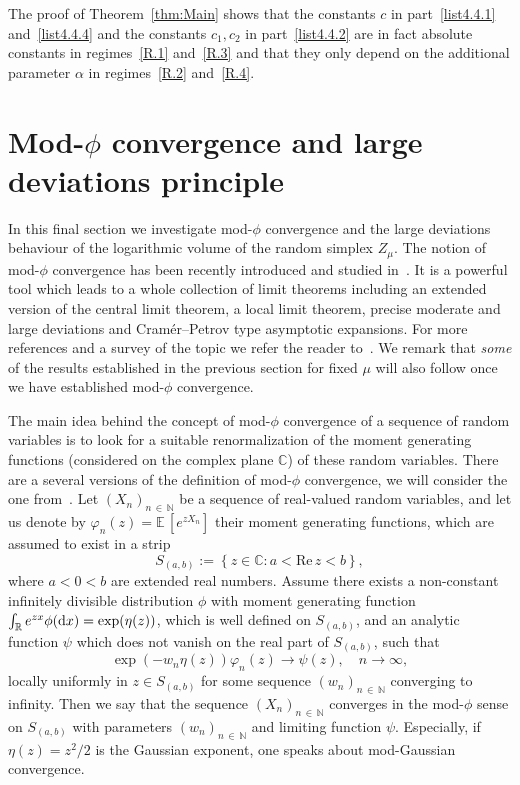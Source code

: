 \documentclass[AHL,Unicode,longabstracts,published]{cedram}
\newcommand{\R}{\mathbb{R}}
\newcommand{\EE}{\mathbb{E}\,}
\newcommand{\dd}{{\rm d}}
\renewcommand{\Re}{\text{Re}\,}
\begin{document}
\begin{rema}
The proof of Theorem~\ref{thm:Main} shows that the constants $c$ in part~\eqref{list4.4.1} and~\eqref{list4.4.4} and the constants $c_1,c_2$ in part~\eqref{list4.4.2} are in fact absolute constants in regimes~\eqref{R.1} and~\eqref{R.3} and that they only depend on the additional parameter $\alpha$ in regimes~\eqref{R.2} and~\eqref{R.4}.
\end{rema}

\section{Mod-\texorpdfstring{$\phi$}{phi} convergence and large deviations principle}\label{sec:ModPhi}

In this final section we investigate mod-$\phi$ convergence and the large deviations behaviour of the logarithmic volume of the random simplex $Z_{\mu}$. The notion of mod-$\phi$ convergence has been recently introduced and studied in~\cite{DKN15, JKN11}. It is a powerful tool which leads to a whole collection of limit theorems including an extended version of the central limit theorem, a local limit theorem, precise moderate and large deviations and Cramér--Petrov type asymptotic expansions. For more references and a survey of the topic we refer the reader to~\cite{ModPhiBook}. We remark that \emph{some} of the results established in the previous section for fixed $\mu$ will also follow once we have established mod-$\phi$ convergence.

The main idea behind the concept of mod-$\phi$ convergence of a sequence of random variables is to look for a suitable renormalization of the moment generating functions (considered on the complex plane $\mathbb{C}$) of these random variables. There are a several versions of the definition of mod-$\phi$ convergence, we will consider the one from~\cite[Definition~1.1]{ModPhiBook}. Let $(X_n)_{n\,\in\,\mathbb{N}}$ be a sequence of real-valued random variables, and let us denote by $\varphi_n(z)=\EE[e^{zX_n}]$ their moment generating functions, which are assumed to exist in a strip
\[
S_{(a,b)}:=\left\{z\in\mathbb{C}\colon a<\Re z<b\right\},
\]
where $a<0<b$ are extended real numbers. Assume there exists a non-constant infinitely divisible distribution $\phi$ with moment generating function $\int_{\R}e^{zx}\phi(\dd x)=\exp(\eta(z))$, which is well defined on $S_{(a,b)}$, and an analytic function $\psi$ which does not vanish on the real part of $S_{(a,b)}$, such that
\[
\exp\left(-w_n\eta(z)\right)\varphi_n(z)\rightarrow \psi(z),\quad n\to\infty,
\]
locally uniformly in $z\in S_{(a,b)}$ for some sequence $(w_n)_{n\,\in\,\mathbb{N}}$ converging to infinity. Then we say that the sequence $(X_n)_{n\,\in\,\mathbb{N}}$ converges in the mod-$\phi$ sense on $S_{(a,b)}$ with parameters $(w_n)_{n\,\in\,\mathbb{N}}$ and limiting function $\psi$. Especially, if $\eta(z)=z^2/2$ is the Gaussian exponent, one speaks about mod-Gaussian convergence.
\end{document}
